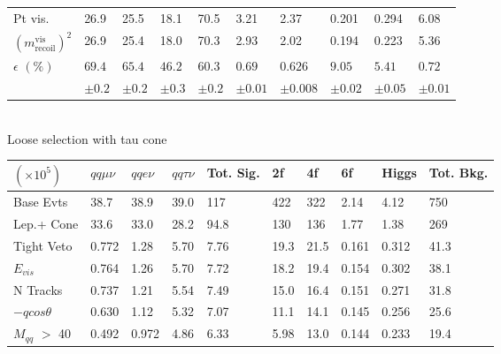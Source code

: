 \begin{table}
\begin{tabular}{|p{}|p{}p{}p{}|p{}|p{}p{}p{}p{}|p{}|}
Pt vis. & {26.9 } &  {25.5} &  {18.1} & {70.5} &  {3.21} &  {2.37} &  {0.201} &  {0.294} & 6.08\\ 

$(m^{\text{vis}}_{\text{recoil}})^2$ & {26.9 } &  {25.4 } &  {18.0} & {70.3} &  {2.93} &  {2.02} &  {0.194} &  {0.223} & 5.36 \\ 
\hline 

 $\epsilon \, \, (\%)$ & $69.4 $ & $65.4 $ & $46.2$ &  $60.3 $ & $0.69 $ & $0.626 $ & $9.05 $ & $5.41 $ & $0.72$ \\ 
 
 			& $\pm 0.2$ & $\pm 0.2$ & $\pm 0.3$ & $\pm 0.2$ & $\pm 0.01$ & $\pm 0.008 $& $\pm 0.02$ & $\pm0.05$  & $\pm 0.01$\\
\hline
\end{tabular}
\quad \quad \\
Loose selection with tau cone\\
\begin{tabular}{|p{}|p{}p{}p{}|p{}|p{}p{}p{}p{}|p{}|}
\hline 
 $(\times 10^5)$  & $qq\mu\nu$ & $qqe\nu$ & $qq\tau\nu$ & Tot. Sig. & 2f & 4f & 6f & Higgs & Tot. Bkg. \\ \hline 
Base Evts & {38.7 } &  {38.9 } &  {39.0} & {117} &  {422} &  {322} &  {2.14} &  {4.12} & 750\\ 
 
Lep.+ Cone & {33.6 } &  {33.0 } &  {28.2} & {94.8} &  {130} &  {136} &  {1.77} &  {1.38} & 269\\ 

Tight Veto & {0.772 } &  {1.28 } &  {5.70} & {7.76} &  {19.3} &  {21.5} &  {0.161} &  {0.312} & 41.3 \\ 
 
$E_{vis}$ & {0.764 } &  {1.26 } &  {5.70} & {7.72} &  {18.2} &  {19.4} &  {0.154} &  {0.302} & 38.1\\ 

N Tracks & {0.737 } &  {1.21 } &  {5.54} & {7.49} &  {15.0} &  {16.4} &  {0.151} &  {0.271} & 31.8\\ 
 
$-qcos\theta$ & {0.630 } &  {1.12 } &  {5.32} & {7.07} &  {11.1} &  {14.1} &  {0.145} &  {0.256} &25.6\\ 
 
$M_{qq}$ $>$ 40 & {0.492 } &  {0.972 } &  {4.86} & {6.33} &  {5.98} &  {13.0} &  {0.144} &  {0.233}& 19.4 \\ 


\end{tabular}
\end{table}
